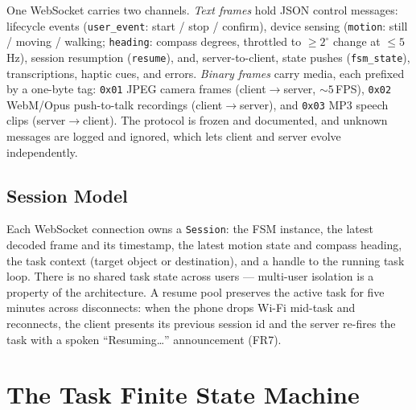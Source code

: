 One WebSocket carries two channels. \emph{Text frames} hold JSON control messages:
lifecycle events (\texttt{user\_event}: start / stop / confirm), device sensing
(\texttt{motion}: still / moving / walking; \texttt{heading}: compass degrees,
throttled to ${\geq}2^\circ$ change at ${\leq}5$\,Hz), session resumption
(\texttt{resume}), and, server-to-client, state pushes (\texttt{fsm\_state}),
transcriptions, haptic cues, and errors. \emph{Binary frames} carry media, each
prefixed by a one-byte tag: \texttt{0x01} JPEG camera frames (client$\to$server,
${\sim}5$\,FPS), \texttt{0x02} WebM/Opus push-to-talk recordings
(client$\to$server), and \texttt{0x03} MP3 speech clips (server$\to$client). The
protocol is frozen and documented, and unknown messages are logged and ignored,
which lets client and server evolve independently.

\subsection{Session Model}

Each WebSocket connection owns a \texttt{Session}: the FSM instance, the latest
decoded frame and its timestamp, the latest motion state and compass heading, the
task context (target object or destination), and a handle to the running task loop.
There is no shared task state across users --- multi-user isolation is a property of
the architecture. A resume pool preserves the active task for five minutes across
disconnects: when the phone drops Wi-Fi mid-task and reconnects, the client presents
its previous session id and the server re-fires the task with a spoken
``Resuming\ldots'' announcement (FR7).

\section{The Task Finite State Machine}
\label{sec:fsm}

